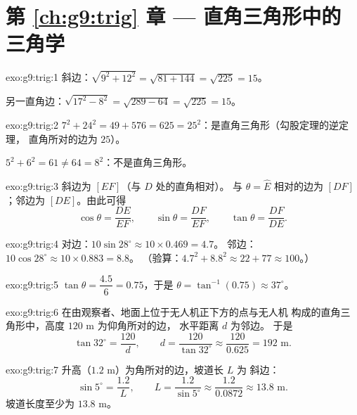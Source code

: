 \section*{第 \ref{ch:g9:trig} 章 --- 直角三角形中的三角学}

\begin{solution}{exo:g9:trig:1}
斜边：$\sqrt{9^2 + 12^2} = \sqrt{81 + 144} = \sqrt{225} = 15$。

另一直角边：$\sqrt{17^2 - 8^2} = \sqrt{289 - 64} = \sqrt{225} = 15$。
\end{solution}

\begin{solution}{exo:g9:trig:2}
$7^2 + 24^2 = 49 + 576 = 625 = 25^2$：是直角三角形（勾股定理的逆定理，
直角所对的边为 $25$）。

$5^2 + 6^2 = 61 \neq 64 = 8^2$：不是直角三角形。
\end{solution}

\begin{solution}{exo:g9:trig:3}
斜边为 $[EF]$（与 $D$ 处的直角相对）。
与 $\theta = \widehat E$ 相对的边为 $[DF]$；邻边为
$[DE]$。由此可得
\[
\cos\theta = \frac{DE}{EF}, \qquad
\sin\theta = \frac{DF}{EF}, \qquad
\tan\theta = \frac{DF}{DE}.
\]
\end{solution}

\begin{solution}{exo:g9:trig:4}
对边：$10 \sin 28^\circ \approx 10 \times 0.469 = 4.7$。
邻边：$10 \cos 28^\circ \approx 10 \times 0.883 = 8.8$。
（验算：$4.7^2 + 8.8^2 \approx 22 + 77 \approx 100$。）
\end{solution}

\begin{solution}{exo:g9:trig:5}
$\tan\theta = \dfrac{4.5}{6} = 0.75$，于是
$\theta = \tan^{-1}(0.75) \approx 37^\circ$。
\end{solution}

\begin{solution}{exo:g9:trig:6}
在由观察者、地面上位于无人机正下方的点与无人机
构成的直角三角形中，高度 $120$ m 为仰角所对的边，
水平距离 $d$ 为邻边。
于是
\[
\tan 32^\circ = \frac{120}{d},
\qquad
d = \frac{120}{\tan 32^\circ} \approx \frac{120}{0.625} = 192 \text{ m}.
\]
\end{solution}

\begin{solution}{exo:g9:trig:7}
升高（$1.2$ m）为角所对的边，坡道长 $L$ 为
斜边：
\[
\sin 5^\circ = \frac{1.2}{L},
\qquad
L = \frac{1.2}{\sin 5^\circ} \approx \frac{1.2}{0.0872} \approx 13.8
\text{ m}.
\]
坡道长度至少为 $13.8$ m。
\end{solution}


